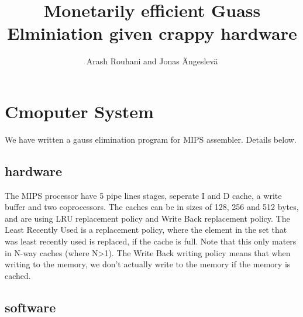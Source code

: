 \documentclass[a4paper,11pt]{article}
\title{Monetarily efficient Guass Elminiation given crappy hardware}
\author{Arash Rouhani and Jonas Ängeslevä}
\begin{document}
\maketitle

\begin{abstract}

\end{abstract}

\section{Cmoputer System}
We have written a gauss elimination program for MIPS assembler. Details below.
\subsection{hardware}
The MIPS processor have 5 pipe lines stages, seperate I and D cache, a write buffer and two coprocessors.
The caches can be in sizes of 128, 256 and 512 bytes, and are using LRU replacement policy and Write Back replacement policy.
The Least Recently Used is a replacement policy, where the element in the set that was least recently used is replaced, if the cache is full. Note that this only maters in N-way caches (where N>1).
The Write Back writing policy means that when writing to the memory, we don't actually write to the memory if the memory is cached. 

\subsection{software}
\end{document}
